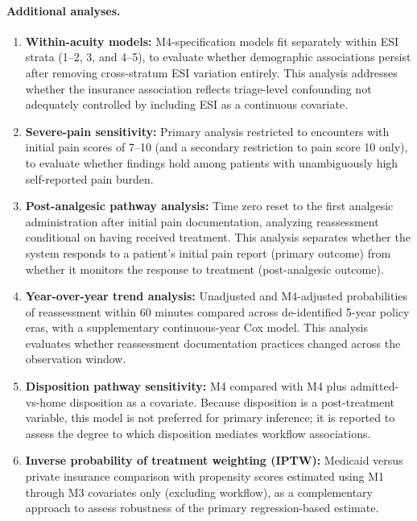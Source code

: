 \documentclass[11pt]{article}
\begin{document}
\paragraph{Additional analyses.}
\label{sec:sensitivity}
\begin{enumerate}
  \item \textbf{Within-acuity models:} M4-specification models fit separately within ESI strata (1--2, 3, and 4--5), to evaluate whether demographic associations persist after removing cross-stratum ESI variation entirely. This analysis addresses whether the insurance association reflects triage-level confounding not adequately controlled by including ESI as a continuous covariate.

  \item \textbf{Severe-pain sensitivity:} Primary analysis restricted to encounters with initial pain scores of 7--10 (and a secondary restriction to pain score 10 only), to evaluate whether findings hold among patients with unambiguously high self-reported pain burden.

  \item \textbf{Post-analgesic pathway analysis:} Time zero reset to the first analgesic administration after initial pain documentation, analyzing reassessment conditional on having received treatment. This analysis separates whether the system responds to a patient's initial pain report (primary outcome) from whether it monitors the response to treatment (post-analgesic outcome).

  \item \textbf{Year-over-year trend analysis:} Unadjusted and M4-adjusted probabilities of reassessment within 60 minutes compared across de-identified 5-year policy eras, with a supplementary continuous-year Cox model. This analysis evaluates whether reassessment documentation practices changed across the observation window.

  \item \textbf{Disposition pathway sensitivity:} M4 compared with M4 plus admitted-vs-home disposition as a covariate. Because disposition is a post-treatment variable, this model is not preferred for primary inference; it is reported to assess the degree to which disposition mediates workflow associations.

  \item \textbf{Inverse probability of treatment weighting (IPTW):} Medicaid versus private insurance comparison with propensity scores estimated using M1 through M3 covariates only (excluding workflow), as a complementary approach to assess robustness of the primary regression-based estimate.


\end{enumerate}
\end{document}
